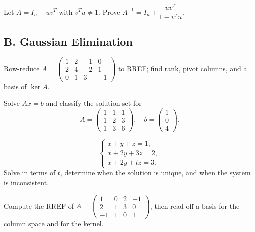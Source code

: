 \documentclass[11pt]{article}
\begin{document}
\begin{problem}
Let $A=I_n-uv^T$ with $v^Tu\neq 1$. Prove $A^{-1}=I_n+\dfrac{uv^T}{1-v^Tu}$.
\end{problem}

\subsection*{B. Gaussian Elimination}
\begin{problem}
Row-reduce $A=\begin{pmatrix}1&2&-1&0\\ 2&4&-2&1\\ 0&1&3&-1\end{pmatrix}$ to RREF; find rank, pivot columns, and a basis of $\ker A$.
\end{problem}

\begin{problem}
Solve $Ax=b$ and classify the solution set for
\[
A=\begin{pmatrix}1&1&1\\ 1&2&3\\ 1&3&6\end{pmatrix},\quad
b=\begin{pmatrix}1\\0\\4\end{pmatrix}.
\]
\end{problem}

\begin{problem}
\[
\begin{cases}
x+y+z=1,\\
x+2y+3z=2,\\
x+2y+t z=3.
\end{cases}
\]
Solve in terms of $t$, determine when the solution is unique, and when the system is inconsistent.
\end{problem}

\begin{problem}
Compute the RREF of
$A=\begin{pmatrix}1&0&2&-1\\ 2&1&3&0\\ -1&1&0&1\end{pmatrix}$,
then read off a basis for the column space and for the kernel.
\end{problem}
\end{document}
